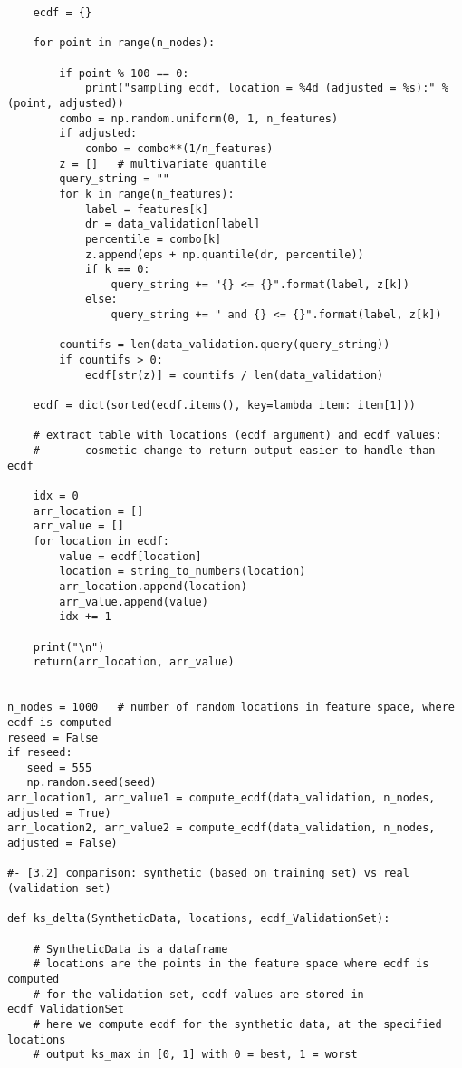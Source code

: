 \documentclass[oneside,10pt]{book}
\begin{document}
\begin{lstlisting}
    ecdf = {}

    for point in range(n_nodes):

        if point % 100 == 0:
            print("sampling ecdf, location = %4d (adjusted = %s):" % (point, adjusted))
        combo = np.random.uniform(0, 1, n_features)
        if adjusted:
            combo = combo**(1/n_features)
        z = []   # multivariate quantile
        query_string = ""
        for k in range(n_features):
            label = features[k]
            dr = data_validation[label]
            percentile = combo[k]
            z.append(eps + np.quantile(dr, percentile))
            if k == 0:
                query_string += "{} <= {}".format(label, z[k])
            else:
                query_string += " and {} <= {}".format(label, z[k])

        countifs = len(data_validation.query(query_string))
        if countifs > 0:
            ecdf[str(z)] = countifs / len(data_validation)

    ecdf = dict(sorted(ecdf.items(), key=lambda item: item[1]))

    # extract table with locations (ecdf argument) and ecdf values:
    #     - cosmetic change to return output easier to handle than ecdf

    idx = 0
    arr_location = []
    arr_value = []
    for location in ecdf:
        value = ecdf[location]
        location = string_to_numbers(location)
        arr_location.append(location)
        arr_value.append(value)
        idx += 1

    print("\n")
    return(arr_location, arr_value)


n_nodes = 1000   # number of random locations in feature space, where ecdf is computed
reseed = False
if reseed:
   seed = 555
   np.random.seed(seed)
arr_location1, arr_value1 = compute_ecdf(data_validation, n_nodes, adjusted = True)
arr_location2, arr_value2 = compute_ecdf(data_validation, n_nodes, adjusted = False)

#- [3.2] comparison: synthetic (based on training set) vs real (validation set)

def ks_delta(SyntheticData, locations, ecdf_ValidationSet):

    # SyntheticData is a dataframe
    # locations are the points in the feature space where ecdf is computed
    # for the validation set, ecdf values are stored in ecdf_ValidationSet
    # here we compute ecdf for the synthetic data, at the specified locations
    # output ks_max in [0, 1] with 0 = best, 1 = worst


\end{lstlisting}
\end{document}
